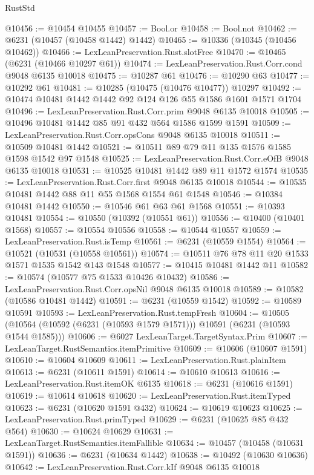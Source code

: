\begin{lexlean}{RustStd}
\begin{coremodule}
{{@10456 := @10454 @10455
@10457 := Bool.or
@10458 := Bool.not
@10462 := @6231 (@10457 (@10458 @1442) @1442)
@10465 := @10336 (@10345 (@10456 @10462))
@10466 := LexLeanPreservation.Rust.slotFree
@10470 := @10465 (@6231 (@10466 @10297 @61))
@10474 := LexLeanPreservation.Rust.Corr.cond @9048 @6135 @10018
@10475 := @10287 @61
@10476 := @10290 @63
@10477 := @10292 @61
@10481 := @10285 (@10475 (@10476 @10477)) @10297
@10492 := @10474 @10481 @1442 @1442 @92 @124 @126 @55 @1586 @1601 @1571 @1704
@10496 := LexLeanPreservation.Rust.Corr.prim @9048 @6135 @10018
@10505 := @10496 @10481 @1442 @85 @91 @432 @564 @1586 @1599 @1591
@10509 := LexLeanPreservation.Rust.Corr.opsCons @9048 @6135 @10018
@10511 := @10509 @10481 @1442
@10521 := @10511 @89 @79 @11 @135 @1576 @1585 @1598 @1542 @97 @1548
@10525 := LexLeanPreservation.Rust.Corr.eOfB @9048 @6135 @10018
@10531 := @10525 @10481 @1442 @89 @11 @1572 @1574
@10535 := LexLeanPreservation.Rust.Corr.first @9048 @6135 @10018
@10544 := @10535 @10481 @1442 @88 @11 @55 @1568 @1554 @61 @1548
@10546 := @10384 @10481 @1442
@10550 := @10546 @61 @63 @61 @1568
@10551 := @10393 @10481
@10554 := @10550 (@10392 (@10551 @61))
@10556 := @10400 (@10401 @1568)
@10557 := @10554 @10556
@10558 := @10544 @10557
@10559 := LexLeanPreservation.Rust.isTemp
@10561 := @6231 (@10559 @1554)
@10564 := @10521 (@10531 (@10558 @10561))
@10574 := @10511 @76 @78 @11 @20 @1533 @1571 @1535 @1542 @143 @1548
@10577 := @10415 @10481 @1442 @11
@10582 := @10574 (@10577 @75 @1533 @10426 @10432)
@10586 := LexLeanPreservation.Rust.Corr.opsNil @9048 @6135 @10018
@10589 := @10582 (@10586 @10481 @1442)
@10591 := @6231 (@10559 @1542)
@10592 := @10589 @10591
@10593 := LexLeanPreservation.Rust.tempFresh
@10604 := @10505 (@10564 (@10592 (@6231 (@10593 @1579 @1571))) @10591 (@6231 (@10593 @1544 @1585)))
@10606 := @6027 LexLeanTarget.TargetSyntax.Prim
@10607 := LexLeanTarget.RustSemantics.itemPrimitive
@10609 := @10606 (@10607 @1591)
@10610 := @10604 @10609
@10611 := LexLeanPreservation.Rust.plainItem
@10613 := @6231 (@10611 @1591)
@10614 := @10610 @10613
@10616 := LexLeanPreservation.Rust.itemOK @6135
@10618 := @6231 (@10616 @1591)
@10619 := @10614 @10618
@10620 := LexLeanPreservation.Rust.itemTyped
@10623 := @6231 (@10620 @1591 @432)
@10624 := @10619 @10623
@10625 := LexLeanPreservation.Rust.primTyped
@10629 := @6231 (@10625 @85 @432 @564)
@10630 := @10624 @10629
@10631 := LexLeanTarget.RustSemantics.itemFallible
@10634 := @10457 (@10458 (@10631 @1591))
@10636 := @6231 (@10634 @1442)
@10638 := @10492 (@10630 @10636)
@10642 := LexLeanPreservation.Rust.Corr.kIf @9048 @6135 @10018
}}
\end{coremodule}
\end{lexlean}
